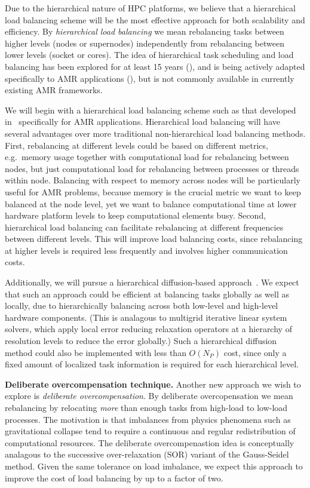 \documentclass[10pt]{article}
\begin{document}
Due to the hierarchical nature of HPC platforms, we believe that a
hierarchical load balancing scheme will be the most effective approach
for both scalability and efficiency.  By \textit{hierarchical load
  balancing} we mean rebalancing tasks between higher levels (nodes or
supernodes) independently from rebalancing between lower levels
(socket or cores).  The idea of hierarchical task scheduling and load
balancing has been explored for at least 15 years (\cite{AhGh94}), and
is being actively adapted specifically to AMR applications
(\cite{LaTa06}), but is not commonly available in currently existing
AMR frameworks.

We will begin with a hierarchical load balancing scheme such as that
developed in~\cite{LaTa06} specifically for AMR applications.
Hierarchical load balancing will have several advantages over more
traditional non-hierarchical load balancing methods.  First,
rebalancing at different levels could be based on different metrics,
e.g.~memory usage together with computational load for rebalancing
between nodes, but just computational load for rebalancing between
processes or threads within node.  Balancing with respect to memory
across nodes will be particularly useful for AMR problems, because
memory is the crucial metric we want to keep balanced at the node
level, yet we want to balance computational time at lower hardware
platform levels to keep computational elements busy.  Second,
hierarchical load balancing can facilitate rebalancing at different
frequencies between different levels.  This will improve load
balancing costs, since rebalancing at higher levels is required less
frequently and involves higher communication costs.

\nocite{ScKa97}
Additionally, we will pursue a hierarchical diffusion-based
approach~\cite{MeMo09}.  We expect that such an approach could be
efficient at balancing tasks globally as well as locally, due to
hierarchically balancing across both low-level and high-level hardware
components.  (This is analagous to multigrid iterative linear system
solvers, which apply local error reducing relaxation operators at a
hierarchy of resolution levels to reduce the error globally.)  Such a
hierarchical diffusion method could also be implemented with less than
$O(N_P)$ cost, since only a fixed amount of localized task information
is required for each hierarchical level.

\textbf{Deliberate overcompensation technique.}
%
Another new approach we wish to explore is \textit{deliberate
  overcompensation}.  By deliberate overcopensation we mean
rebalancing by relocating \textit{more} than enough tasks from
high-load to low-load processes.  The motivation is that imbalances
from physics phenomena such as gravitational collapse tend to require
a continuous and regular redistribution of computational resources.
The deliberate overcompenastion idea is conceptually analagous to the
successive over-relaxation (SOR) variant of the Gauss-Seidel method.
Given the same tolerance on load imbalance, we expect this approach to
improve the cost of load balancing by up to a factor of two.
\end{document}

